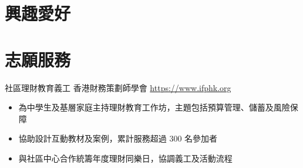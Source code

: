 \documentclass[a4paper, serif, 10pt]{moderncv}
\begin{document}
\section{興趣愛好}

\section{志願服務}

        {社區理財教育義工}
        {香港財務策劃師學會}
        {\url{https://www.ifphk.org}}
        {}
        {\begin{itemize}
\item 為中學生及基層家庭主持理財教育工作坊，主題包括預算管理、儲蓄及風險保障
\item 協助設計互動教材及案例，累計服務超過 300 名參加者
\item 與社區中心合作統籌年度理財同樂日，協調義工及活動流程
\end{itemize}}
    
\end{document}
